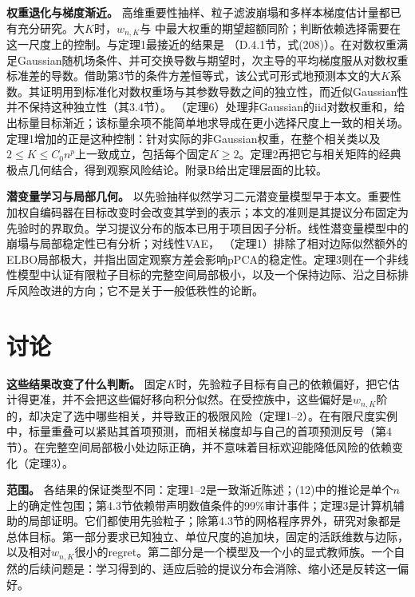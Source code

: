 \documentclass[11pt,a4paper]{article}
\begin{document}
\textbf{权重退化与梯度渐近。}
高维重要性抽样\citep{agapiou2017, chatterjee2018}、粒子滤波崩塌\citep{bengtsson2008, bickel2008, snyder2008}和多样本梯度估计量\citep{rainforth2018, tucker2019}都已有充分研究。大\(K\)时，\(w_{n,K}\)与
\citet{bickel2008}
中最大权重的期望超额同阶；判断依赖选择需要在这一尺度上的控制。与定理1最接近的结果是
\citet{daudel2026}
（D.4.1节，式(208)）。在对数权重满足Gaussian随机场条件、并可交换导数与期望时，次主导的平均梯度服从对数权重标准差的导数。借助第3节的条件方差恒等式，该公式可形式地预测本文的大\(K\)系数。其证明用到标准化对数权重场与其参数导数之间的独立性，而近似Gaussian性并不保持这种独立性（其3.4节）。
\citet{daudel2023}
（定理6）处理非Gaussian的iid对数权重和，给出标量目标渐近；该标量余项不能简单地求导成在更小选择尺度上一致的相关场。定理1增加的正是这种控制：针对实际的非Gaussian权重，在整个相关类以及\(2\le K\le C_0n^p\)上一致成立，包括每个固定\(K\ge2\)。定理2再把它与相关矩阵的经典极点几何\citep{litam1994}结合，得到观察风险结论。附录B给出定理层面的比较。

\textbf{潜变量学习与局部几何。}
以先验抽样似然学习二元潜变量模型早于本文\citep{tipping1998}。重要性加权自编码器在目标改变时会改变其学到的表示\citep[Section
5.2 and Table
2]{burda2016}；本文的准则是其提议分布固定为先验时的界取负。学习提议分布的版本已用于项目因子分析\citep{urban2021}。线性潜变量模型中的崩塌与局部稳定性已有分析\citep{lucas2019, wangziyin2022}；对线性VAE，
\citet{lucas2019}
（定理1）排除了相对边际似然额外的ELBO局部极大，并指出固定观察方差会影响pPCA的稳定性。定理3则在一个非线性模型中认证有限粒子目标的完整空间局部极小，以及一个保持边际、沿之目标排斥风险改进的方向；它不是关于一般低秩性的论断。

\section{讨论}\label{ux8ba8ux8bba}

\textbf{这些结果改变了什么判断。}
固定\(K\)时，先验粒子目标有自己的依赖偏好，把它估计得更准，并不会把这些偏好移向积分似然。在受控族中，这些偏好是\(w_{n,K}\)阶的，却决定了选中哪些相关，并导致正的极限风险（定理1--2）。在有限尺度实例中，标量重叠可以紧贴其首项预测，而相关梯度却与自己的首项预测反号（第4节）。在完整空间局部极小处边际正确，并不意味着目标欢迎能降低风险的依赖变化（定理3）。

\textbf{范围。}
各结果的保证类型不同：定理1--2是一致渐近陈述；(12)中的推论是单个\(n\)上的确定性包围；第4.3节依赖带声明数值条件的99\%审计事件；定理3是计算机辅助的局部证明。它们都使用先验粒子；除第4.3节的网格程序界外，研究对象都是总体目标。第一部分要求已知独立、单位尺度的追加块，固定的活跃维数与边际，以及相对\(w_{n,K}\)很小的regret。第二部分是一个模型及一个小的显式教师族。一个自然的后续问题是：学习得到的、适应后验的提议分布\citep{burda2016}会消除、缩小还是反转这一偏好。
\end{document}
